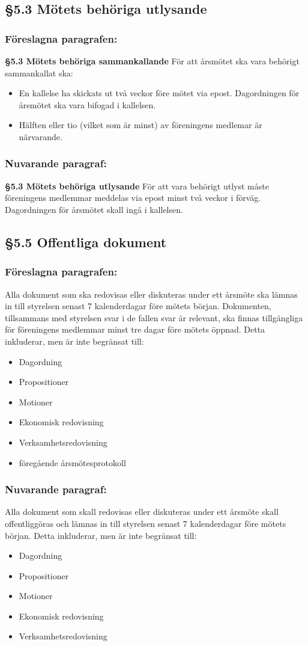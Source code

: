 \documentclass[11pt,a4paper]{article}
\newcommand{\change}[3]{\subsection*{#1}
  \subsubsection*{Föreslagna paragrafen:}
  #2
  \subsubsection*{Nuvarande paragraf:}
  #3}
\begin{document}
\change{§5.3 Mötets behöriga utlysande}{
\textbf{§5.3 Mötets behöriga sammankallande}
För att årsmötet ska vara behörigt sammankallat ska:
\begin{itemize}
\item En kallelse ha skickats
ut två veckor före mötet via epost. Dagordningen för årsmötet ska
vara bifogad i kallelsen.
\item Hälften eller tio (vilket som är minst) av föreningens medlemar
är närvarande.
\end{itemize}}{
\textbf{§5.3 Mötets behöriga utlysande}
För att vara behörigt utlyst måste föreningens medlemmar meddelas via epost minst två veckor i förväg. Dagordningen för årsmötet skall ingå i kallelsen.}

\change{§5.5 Offentliga dokument}{
Alla dokument som ska redovisas eller diskuteras under ett årsmöte
ska lämnas in till styrelsen senast
7 kalenderdagar före mötets början. Dokumenten, tillsammans med
styrelsen svar i de fallen svar är relevant, ska finnas tillgängliga
för föreningens medlemmar minst tre dagar
före mötets öppnad.
Detta inkluderar, men är inte begränsat till:
\begin{itemize}
\item Dagordning
\item Propositioner
\item Motioner
\item Ekonomisk redovisning
\item Verksamhetsredovisning
\item föregående årsmötesprotokoll
\end{itemize}}{
Alla dokument som skall redovisas eller diskuteras under ett årsmöte skall offentliggöras och lämnas in till styrelsen senast 7 kalenderdagar före mötets början.
Detta inkluderar, men är inte begränsat till:
\begin{itemize}
\item Dagordning
\item Propositioner
\item Motioner
\item Ekonomisk redovisning
\item Verksamhetsredovisning
\end{itemize}}
\end{document}
